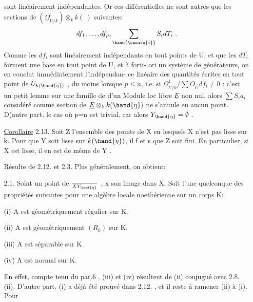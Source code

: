 
sont linéairement indépendantes. Or ces différentielles ne sont autres
que les sections de $(\underline{\Omega}^1_{U/k})\otimes_k k(\ )$ suivantes:
\[ df_1, \ldots, df_p , \sum_{\hand{\unsure{i}}} S_i dT_i \ . \]
Comme les $df_i$ sont linéairement indépendants en tout points de U, et
que les $dT_i$ forment une base  en tout point de U,  et à forti-%
ori un système de générateurs, on en conclut immédiatement l'indépendan-%
ce linéaire des quantités écrites en tout point de $U_{k(\hand{\eta})}$ , du moins
lorsque $p\leq n$, i.e. si  $\underline{\Omega}^1_{U/k} / \sum \underline{O}_U df_i \neq 0$ : c'est un petit
lemme sur une famille de   d'un Module loc libre $\underline{E}$ non
nul, alors $\sum S_i a_i$ considéré comme section de $\underline{E}\otimes_k k(\hand{\eta})$ ne s'annule
en aucun point. D(autre part, le cas où p=n est trivial, car alors
$Y_{\hand{\eta}} = \emptyset$ .

\uline{Corollaire} 2.13. Soit Z l'ensemble des points de X en lesquels X
n'est pas lisse sur k. Pour que Y soit lisse sur $k(\hand{\eta})$, il f et s
que Z soit fini. En particulier, si X est lisse, il en est de même de
Y .

Résulte de 2.12. et 2.3. Plus généralement, on obtient:

\uline{} 2.1. Soint  un point de $\over{X}{Y}_{\hand{\eta}}$ , x son image dans X. Soit
  l'une quelconque des propriétés suivantes pour une algèbre
locale noethérienne sur un corps K:

(i) A est géométriquement régulier sur K.

(ii) A est géométriquement $(R_k)$ sur K.

(iii) A est séparable sur K.

(iv) A est  normal sur K.

 En effet, compte tenu du par.6 , (iii) et (iv)
résultent de (ii) conjugué avec 2.8. (ii). D'autre part, (i)
a déjà été prouvé dans 2.12. , et il reste à ramener (ii) à (i). Pour

